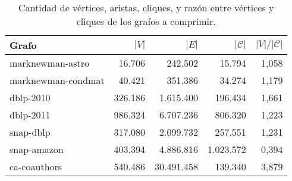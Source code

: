 \begin{table}
	\caption{Cantidad de vértices, aristas, cliques, y razón entre vértices y cliques de los grafos a comprimir.}
	\label{table:gafros}
	\centering
	\begin{tabular}{l|r|r|r|r}
		\toprule
		Grafo & $|V|$ & $|E|$ & $ |\mathcal{C}|$ & $|V|/|\mathcal{C}|$ \\
		\midrule
		marknewman-astro & 16.706 & 242.502 & 15.794 & 1,058  \\
		marknewman-condmat & 40.421 & 351.386 & 34.274 & 1,179 \\
		dblp-2010 & 326.186 & 1.615.400 & 196.434 & 1,661  \\
         dblp-2011 & 986.324 & 6.707.236 & 806.320 & 1,223 \\
		snap-dblp & 317.080 & 2.099.732 & 257.551 & 1,231 \\
         snap-amazon & 403.394 & 4.886.816 & 1.023.572 & 0,394 \\
         ca-coauthors & 540.486 & 30.491.458 & 139.340 & 3,879 \\
         \bottomrule
	\end{tabular}
\end{table}
